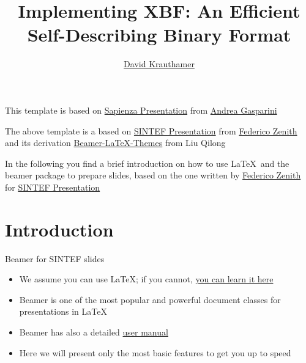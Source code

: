 \documentclass{beamer}
\title{Implementing XBF: An Efficient Self-Describing Binary Format}
\author{\href{mailto:dkrautha@pm.me}{David Krauthamer}}
\newcommand{\hrefcol}[2]{\textcolor{cyan}{\href{#1}{#2}}}
\begin{document}
\maketitle

\begin{frame}

	This template is based on \hrefcol{https://www.overleaf.com/latex/templates/sapienza-presentation/yyksmrskffhk}{Sapienza Presentation} from \hrefcol{mailto:andrea@gasparini.cloud}{Andrea Gasparini}

	\vspace{\baselineskip}

	The above template is a based on \hrefcol{https://www.overleaf.com/latex/templates/sintef-presentation/jhbhdffczpnx}{SINTEF Presentation} from \hrefcol{mailto:federico.zenith@sintef.no}{Federico Zenith} and its derivation \hrefcol{https://github.com/TOB-KNPOB/Beamer-LaTeX-Themes}{Beamer-LaTeX-Themes} from Liu Qilong

	\vspace{\baselineskip}

	In the following you find a brief introduction on how to use \LaTeX\ and the beamer package to prepare slides, based on the one written by \hrefcol{mailto:federico.zenith@sintef.no}{Federico Zenith} for \hrefcol{https://www.overleaf.com/latex/templates/sintef-presentation/jhbhdffczpnx}{SINTEF Presentation}


\end{frame}

\section{Introduction}

\begin{frame}{Beamer for SINTEF slides}
	\begin{itemize}
		\item We assume you can use \LaTeX; if you cannot,
		      \hrefcol{http://en.wikibooks.org/wiki/LaTeX/}{you can learn it here}
		\item Beamer is one of the most popular and powerful document
		      classes for presentations in \LaTeX
		\item Beamer has also a detailed
		      \hrefcol{http://www.ctan.org/tex-archive/macros/latex/contrib/beamer/doc/beameruserguide.pdf}{user
			      manual}
		\item Here we will present only the most basic features to get you up to speed
	\end{itemize}
\end{frame}
\end{document}
